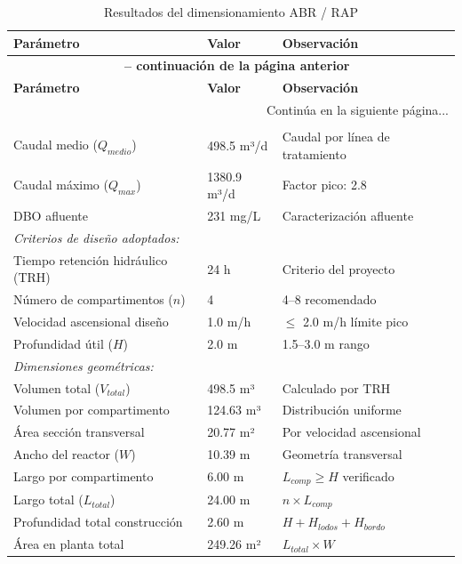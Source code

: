\documentclass[12pt,a4paper]{article}
\begin{document}
\begin{longtable}{p{6cm}p{3cm}p{5cm}}
\caption{Resultados del dimensionamiento ABR / RAP} \\
\toprule
\textbf{Parámetro} & \textbf{Valor} & \textbf{Observación} \\
\midrule
\endfirsthead
\multicolumn{3}{c}{
    {\bfseries \tablename\ \thetable{} -- continuación de la página anterior}
} \\
\toprule
\textbf{Parámetro} & \textbf{Valor} & \textbf{Observación} \\
\midrule
\endhead
\midrule
\multicolumn{3}{r}{Continúa en la siguiente página...} \\
\endfoot
\bottomrule
\endlastfoot

\multicolumn{3}{l}{\textit{Parámetros de entrada:}} \\
Caudal medio ($Q_{medio}$) & 498.5 m³/d & Caudal por línea de tratamiento \\
Caudal máximo ($Q_{max}$) & 1380.9 m³/d & Factor pico: 2.8 \\
DBO afluente & 231 mg/L & Caracterización afluente \\
\midrule

\multicolumn{3}{l}{\textit{Criterios de diseño adoptados:}} \\
Tiempo retención hidráulico (TRH) & 24 h & Criterio del proyecto \\
Número de compartimentos ($n$) & 4 & 4--8 recomendado \\
Velocidad ascensional diseño & 1.0 m/h & $\leq$ 2.0 m/h límite pico \\
Profundidad útil ($H$) & 2.0 m & 1.5--3.0 m rango \\
\midrule

\multicolumn{3}{l}{\textit{Dimensiones geométricas:}} \\
Volumen total ($V_{total}$) & 498.5 m³ & Calculado por TRH \\
Volumen por compartimento & 124.63 m³ & Distribución uniforme \\
Área sección transversal & 20.77 m² & Por velocidad ascensional \\
Ancho del reactor ($W$) & 10.39 m & Geometría transversal \\
Largo por compartimento & 6.00 m & $L_{comp} \geq H$ verificado \\
Largo total ($L_{total}$) & 24.00 m & $n \times L_{comp}$ \\
Profundidad total construcción & 2.60 m & $H + H_{lodos} + H_{bordo}$ \\
Área en planta total & 249.26 m² & $L_{total} \times W$ \\
\midrule


\end{longtable}
\end{document}
